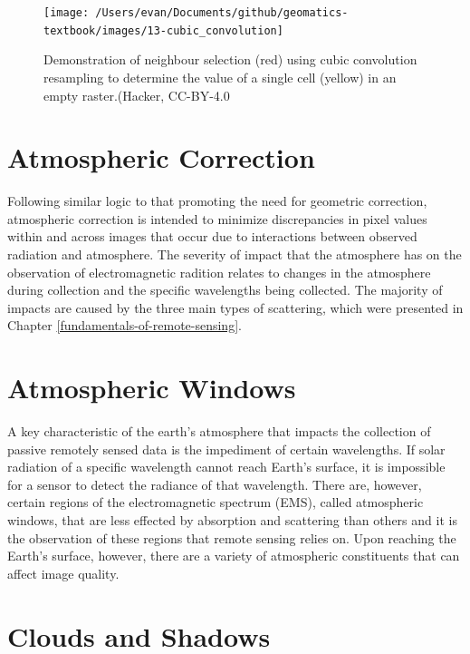 \documentclass[
]{book}
\begin{document}
\begin{figure}
\texttt{[image: /Users/evan/Documents/github/geomatics-textbook/images/13-cubic\_convolution]} \caption{Demonstration of neighbour selection (red) using cubic convolution resampling to determine the value of a single cell (yellow) in an empty raster.(Hacker, CC-BY-4.0}\label{fig:13-cubic}
\end{figure}

\hypertarget{atmospheric-correction}{%
\section{Atmospheric Correction}\label{atmospheric-correction}}

Following similar logic to that promoting the need for geometric
correction, atmospheric correction is intended to minimize discrepancies
in pixel values within and across images that occur due to interactions
between observed radiation and atmosphere. The severity of impact that
the atmosphere has on the observation of electromagnetic radition
relates to changes in the atmosphere during collection and the specific
wavelengths being collected. The majority of impacts are caused by the
three main types of scattering, which were presented in Chapter
\ref{fundamentals-of-remote-sensing}.

\hypertarget{atmospheric-windows}{%
\section{Atmospheric Windows}\label{atmospheric-windows}}

A key characteristic of the earth's atmosphere that impacts the
collection of passive remotely sensed data is the impediment of certain
wavelengths. If solar radiation of a specific wavelength cannot reach
Earth's surface, it is impossible for a sensor to detect the radiance of
that wavelength. There are, however, certain regions of the
electromagnetic spectrum (EMS), called atmospheric windows, that are
less effected by absorption and scattering than others and it is the
observation of these regions that remote sensing relies on. Upon
reaching the Earth's surface, however, there are a variety of
atmospheric constituents that can affect image quality.

\hypertarget{clouds-and-shadows}{%
\section{Clouds and Shadows}\label{clouds-and-shadows}}
\end{document}
